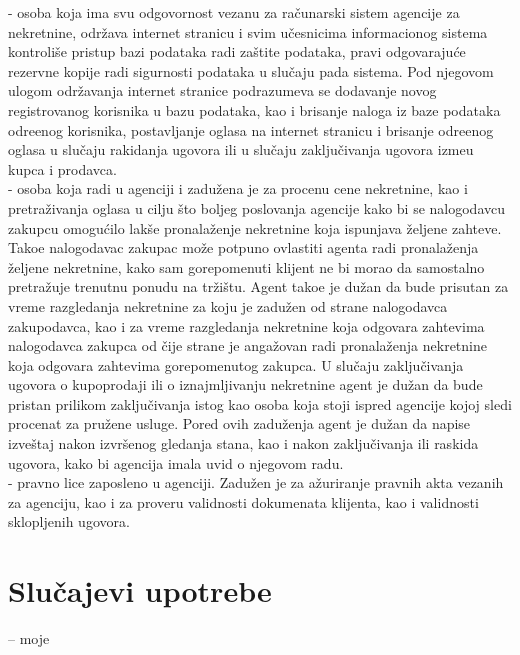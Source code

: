 \documentclass{article}
\begin{document}
 - osoba koja ima svu odgovornost vezanu za ra\v {c}unarski sistem agencije za nekretnine, odr\v {z}ava internet stranicu i svim u\v {c}esnicima informacionog sistema kontroli\v {s}e pristup bazi podataka radi za\v {s}tite podataka, pravi odgovaraju\' ce rezervne kopije radi sigurnosti podataka u slu\v {c}aju pada sistema. Pod njegovom ulogom odr\v {z}avanja internet stranice podrazumeva se dodavanje novog registrovanog korisnika u bazu podataka, kao i brisanje naloga iz baze podataka odre\dj enog korisnika, postavljanje oglasa na internet stranicu i brisanje odre\dj enog oglasa u slu\v {c}aju rakidanja ugovora ili u slu\v {c}aju zaklju\v {c}ivanja ugovora izme\dj u kupca i prodavca.\\
 - osoba koja radi u agenciji i zadu\v {z}ena je za procenu cene nekretnine, kao i pretra\v {z}ivanja oglasa u cilju \v {s}to boljeg poslovanja agencije kako bi se nalogodavcu zakupcu omogu\' cilo lak\v {s}e pronala\v {z}enje nekretnine koja ispunjava \v {z}eljene zahteve. Tako\dj e nalogodavac zakupac mo\v {z}e potpuno ovlastiti agenta radi pronala\v {z}enja \v {z}eljene nekretnine, kako sam gorepomenuti klijent ne bi morao da samostalno pretra\v {z}uje trenutnu ponudu na tr\v {z}i\v {s}tu. Agent tako\dj e je du\v {z}an da bude prisutan za vreme razgledanja nekretnine za koju je zadu\v {z}en od strane nalogodavca zakupodavca, kao i za vreme razgledanja nekretnine koja odgovara zahtevima nalogodavca zakupca od \v {c}ije strane je anga\v {z}ovan radi pronala\v {z}enja nekretnine koja odgovara zahtevima gorepomenutog zakupca. U slu\v {c}aju zaklju\v {c}ivanja ugovora o kupoprodaji ili o iznajmljivanju nekretnine agent je du\v {z}an da bude pristan prilikom zaklju\v {c}ivanja istog kao osoba koja stoji ispred agencije kojoj sledi procenat za pru\v {z}ene usluge. Pored ovih zadu\v {z}enja agent je du\v {z}an da napise izve\v {s}taj nakon izvr\v {s}enog gledanja stana, kao i nakon zaklju\v {c}ivanja ili raskida ugovora, kako bi agencija imala uvid o njegovom radu.\\
 - pravno lice zaposleno u agenciji. Zadu\v {z}en je za a\v {z}uriranje pravnih akta vezanih za agenciju, kao i za proveru validnosti dokumenata klijenta, kao i validnosti sklopljenih ugovora.\\ 

\newpage
\section{\bfseries Slu\v{c}ajevi upotrebe}
-- moje
\end{document}

